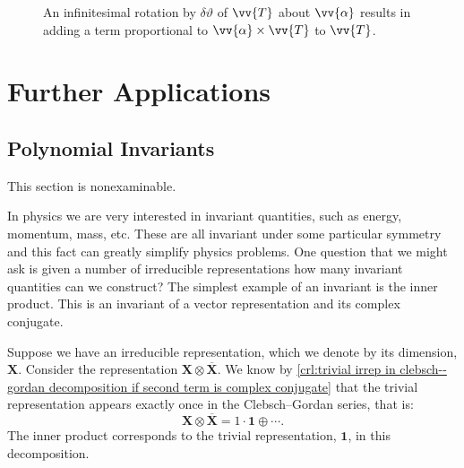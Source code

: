 \documentclass[fleqn]{NotesClass}
\newcommand*{\directsum}{\oplus}
\newcommand*{\directproduct}{\otimes}
\newcommand*{\rep}[1]{\mathbf{#1}}
\begin{document}
    \begin{figure}
        \caption[Infinitesimal rotation.]{An infinitesimal rotation by \(\delta \vartheta\) of \(\vv{T}\) about \(\vv{\alpha}\) results in adding a term proportional to \(\vv{\alpha} \times \vv{T}\) to \(\vv{T}\).}
        \label{fig:infinitesimal rotation}
    \end{figure}
    
    \chapter{Further Applications}
    \section{Polynomial Invariants}
    \begin{rmk}
        This section is nonexaminable.
    \end{rmk}
    In physics we are very interested in invariant quantities, such as energy, momentum, mass, etc.
    These are all invariant under some particular symmetry and this fact can greatly simplify physics problems.
    One question that we might ask is given a number of irreducible representations how many invariant quantities can we construct?
    The simplest example of an invariant is the inner product.
    This is an invariant of a vector representation and its complex conjugate.
    
    Suppose we have an irreducible representation, which we denote by its dimension, \(\rep{X}\).
    Consider the representation \(\rep{X} \directproduct \overline{\rep{X}}\).
    We know by \cref{crl:trivial irrep in clebsch--gordan decomposition if second term is complex conjugate} that the trivial representation appears exactly once in the Clebsch--Gordan series, that is:
    \begin{equation}
        \rep{X} \directproduct \overline{\rep{X}} = 1\cdot \rep{1} \directsum \dotsb.
    \end{equation}
    The inner product corresponds to the trivial representation, \(\rep{1}\), in this decomposition.
    
\end{document}
